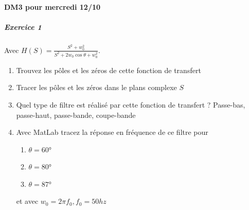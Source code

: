 \documentclass{article}
\theoremstyle{plain}%
\theoremstyle{definition}
\theoremstyle{remark}
\begin{document}
\paragraph*{DM3 pour mercredi 12/10}
\subparagraph*{Exercice 1}
Avec $ H(S) = \frac{S^2 + w_0^2}{S^2 + 2w_0 \cos \theta + w_0^2} $. \begin{enumerate}
    \item Trouvez les pôles et les zéros de cette fonction de transfert
    \item Tracer les pôles et les zéros dans le plans complexe $ S $ 
    \item Quel type de filtre est réalisé par cette fonction de transfert ? Passe-bas, passe-haut, passe-bande, coupe-bande
    \item Avec MatLab tracez la réponse en fréquence de ce filtre pour \begin{enumerate}
        \item $ \theta = 60 \text{°}$
        \item $ \theta = 80 \text{°}$
        \item $ \theta = 87 \text{°}$
    \end{enumerate}
    et avec $ w_0 = 2 \pi f_0, f_0 = 50hz $ 
\end{enumerate}
\end{document}
